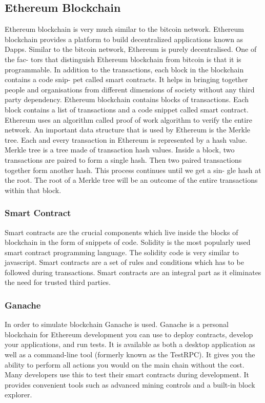 \subsection{Ethereum Blockchain}

Ethereum blockchain is very much similar to the bitcoin network. Ethereum
blockchain provides a platform to build decentralized applications known as Dapps.
Similar to the bitcoin network, Ethereum is purely decentralised. One of the fac-
tors that distinguish Ethereum blockchain from bitcoin is that it is programmable.
In addition to the transactions, each block in the blockchain contains a code snip-
pet called smart contracts. It helps in bringing together people and organisations
from different dimensions of society without any third party dependency. Ethereum 
blockchain contains blocks of transactions. Each block contains a list of transactions
and a code snippet called smart contract. Ethereum uses an algorithm called proof
of work algorithm to verify the entire network. An important data structure that
is used by Ethereum is the Merkle tree. Each and every transaction in Ethereum is
represented by a hash value. Merkle tree is a tree made of transaction hash values.
Inside a block, two transactions are paired to form a single hash. Then two paired
transactions together form another hash. This process continues until we get a sin-
gle hash at the root. The root of a Merkle tree will be an outcome of the entire
transactions within that block.

\subsubsection{Smart Contract}

Smart contracts are the crucial components which
live inside the blocks of blockchain in the form of snippets of code. Solidity is the
most popularly used smart contract programming language. The solidity code is
very similar to javascript. Smart contracts are a set of rules and conditions which
has to be followed during transactions. Smart contracts are an integral part as it
eliminates the need for trusted third parties.

\subsubsection{Ganache}

In order to simulate blockchain Ganache is used. 
Ganache is a personal blockchain for Ethereum development you can use to deploy contracts, develop your applications, and run tests.
It is available as both a desktop application as well as a command-line tool (formerly known as the TestRPC).
It gives you the ability to perform all actions you would on the main chain without the cost. 
Many developers use this to test their smart contracts during development. 
It provides convenient tools such as advanced mining controls and a built-in block explorer.

